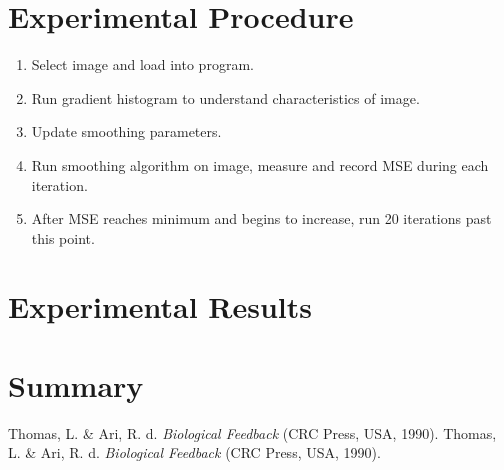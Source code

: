 \documentclass{article}
\begin{document}
  \newpage
  \section{Experimental Procedure}
  \begin{enumerate}
    \item Select image and load into program.
    \item Run gradient histogram to understand characteristics of image.
    \item Update smoothing parameters.
    \item Run smoothing algorithm on image, measure and record MSE during each iteration.
    \item After MSE reaches minimum and begins to increase, run 20 iterations past this point.
  \end{enumerate}




  \newpage
  \section{Experimental Results}


  \section{Summary}


  \begin{thebibliography}{unsrt}
      Thomas, L. \& Ari, R. d. \emph{Biological Feedback} (CRC Press, USA, 1990).
      Thomas, L. \& Ari, R. d. \emph{Biological Feedback} (CRC Press, USA, 1990).
  \end{thebibliography}
\end{document}
